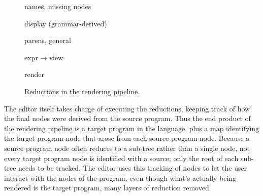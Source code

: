 \begin{figure}[ht]

	
	\quad names, missing nodes
	
	\quad display (grammar-derived)
	
	
	\quad parens, general
	
	\quad expr$\to$view
	
	
	\quad render
	
	

  \caption{Reductions in the rendering pipeline.}
  \label{fig-pipeline} 
\end{figure}

The editor itself takes charge of executing the reductions, keeping track of how the final  nodes were derived from the source program. Thus the end product of the rendering pipeline is a target program in the  language, plus a map identifying the target program node that arose from each source program node. Because a source program node often reduces to a sub-tree rather than a single node, not every target program node is identified with a source; only the root of each sub-tree needs to be tracked. The editor uses this tracking of nodes to let the user interact with the nodes of the  program, even though what's actually being rendered is the target program, many layers of reduction removed.


